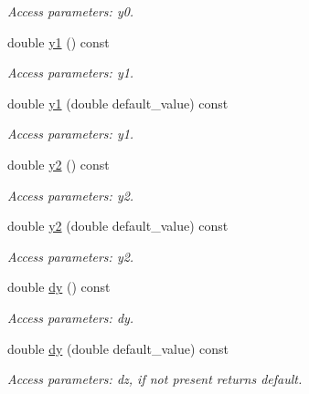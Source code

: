 \begin{DoxyCompactItemize}
\begin{DoxyCompactList}\small\item\em Access parameters: y0. \item\end{DoxyCompactList}\item 
double \hyperlink{struct_d_d4hep_1_1_x_m_l_1_1_dimension_ac48896940d49da56992a82d0c6fd23ba}{y1} () const 
\begin{DoxyCompactList}\small\item\em Access parameters: y1. \item\end{DoxyCompactList}\item 
double \hyperlink{struct_d_d4hep_1_1_x_m_l_1_1_dimension_a75861ed658980402c4d22308a4e173b4}{y1} (double default\_\-value) const 
\begin{DoxyCompactList}\small\item\em Access parameters: y1. \item\end{DoxyCompactList}\item 
double \hyperlink{struct_d_d4hep_1_1_x_m_l_1_1_dimension_acf89efeba201c33e2a2ef2dcb43705b9}{y2} () const 
\begin{DoxyCompactList}\small\item\em Access parameters: y2. \item\end{DoxyCompactList}\item 
double \hyperlink{struct_d_d4hep_1_1_x_m_l_1_1_dimension_ad9ab438e2b89a0ccf4560644a93f3cd6}{y2} (double default\_\-value) const 
\begin{DoxyCompactList}\small\item\em Access parameters: y2. \item\end{DoxyCompactList}\item 
double \hyperlink{struct_d_d4hep_1_1_x_m_l_1_1_dimension_aca78889c0705fa32ae7e7381b97c9d0c}{dy} () const 
\begin{DoxyCompactList}\small\item\em Access parameters: dy. \item\end{DoxyCompactList}\item 
double \hyperlink{struct_d_d4hep_1_1_x_m_l_1_1_dimension_a4810f7f9300523c5695737ec598745b0}{dy} (double default\_\-value) const 
\begin{DoxyCompactList}\small\item\em Access parameters: dz, if not present returns default. \item\end{DoxyCompactList}\item 

\end{DoxyCompactItemize}

